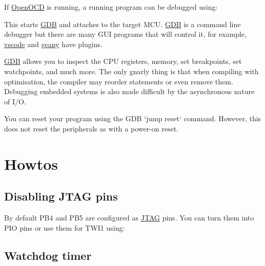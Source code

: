If \url{OpenOCD} is running, a running program can be debugged using:

\begin{Shaded}
\begin{Highlighting}[]
\NormalTok{$ }
\end{Highlighting}
\end{Shaded}

This starts \url{GDB} and attaches to the target MCU. \url{GDB} is a
command line debugger but there are many GUI programs that will control
it, for example, \url{vscode} and \url{geany} have plugins.

\url{GDB} allows you to inspect the CPU registers, memory, set
breakpoints, set watchpoints, and much more. The only gnarly thing is
that when compiling with optimisation, the compiler may reorder
statements or even remove them. Debugging embedded systems is also made
difficult by the asynchronous nature of I/O.

You can reset your program using the GDB `jump reset` command. However,
this does not reset the peripherals as with a power-on reset.

\section{Howtos}
\label{howtos}

\subsection{Disabling JTAG pins}
\label{disabling-jtag-pins}

By default PB4 and PB5 are configured as \url{JTAG} pins. You can turn
them into PIO pins or use them for TWI1 using:

\begin{Shaded}
\begin{Highlighting}[]

\NormalTok{)}
\NormalTok{\{}
\NormalTok{\}}
\end{Highlighting}
\end{Shaded}

\subsection{Watchdog timer}
\label{watchdog-timer}

